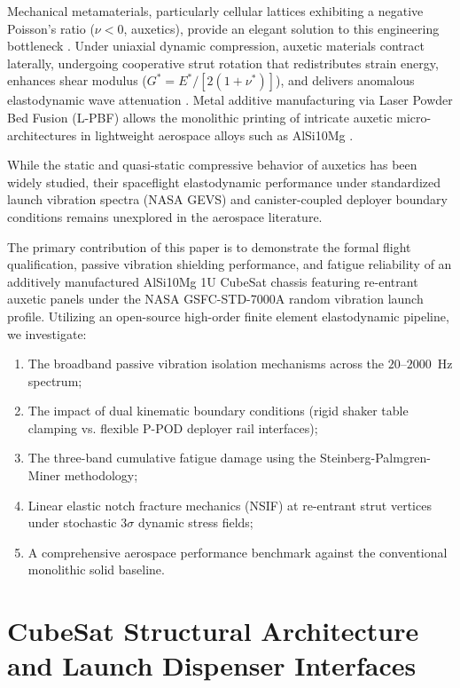 \documentclass[preprint,12pt,3p]{elsarticle}
\begin{document}
Mechanical metamaterials, particularly cellular lattices exhibiting a negative Poisson's ratio ($\nu < 0$, auxetics), provide an elegant solution to this engineering bottleneck \cite{lakes1987,alomarah2017}. Under uniaxial dynamic compression, auxetic materials contract laterally, undergoing cooperative strut rotation that redistributes strain energy, enhances shear modulus ($G^* = E^* / [2(1+\nu^*)]$), and delivers anomalous elastodynamic wave attenuation \cite{hussein2014,cui2025}. Metal additive manufacturing via Laser Powder Bed Fusion (L-PBF) allows the monolithic printing of intricate auxetic micro-architectures in lightweight aerospace alloys such as AlSi10Mg \cite{zhong2023,collini2024}.

While the static and quasi-static compressive behavior of auxetics has been widely studied, their spaceflight elastodynamic performance under standardized launch vibration spectra (NASA GEVS) and canister-coupled deployer boundary conditions remains unexplored in the aerospace literature. 

The primary contribution of this paper is to demonstrate the formal flight qualification, passive vibration shielding performance, and fatigue reliability of an additively manufactured AlSi10Mg 1U CubeSat chassis featuring re-entrant auxetic panels under the NASA GSFC-STD-7000A random vibration launch profile. Utilizing an open-source high-order finite element elastodynamic pipeline, we investigate:
\begin{enumerate}
  \item The broadband passive vibration isolation mechanisms across the $20\text{--}2000$~Hz spectrum;
  \item The impact of dual kinematic boundary conditions (rigid shaker table clamping vs. flexible P-POD deployer rail interfaces);
  \item The three-band cumulative fatigue damage using the Steinberg-Palmgren-Miner methodology;
  \item Linear elastic notch fracture mechanics (NSIF) at re-entrant strut vertices under stochastic $3\sigma$ dynamic stress fields;
  \item A comprehensive aerospace performance benchmark against the conventional monolithic solid baseline.
\end{enumerate}

\section{CubeSat Structural Architecture and Launch Dispenser Interfaces}
\label{sec:architecture}
\end{document}

